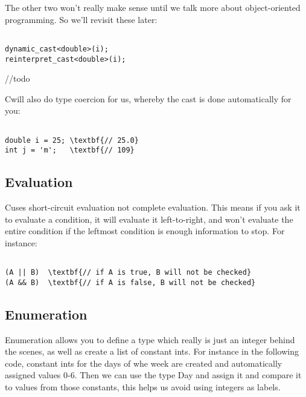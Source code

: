 \documentclass{IEEEtran}
\newcommand{\cpp}{C\nolinebreak\hspace{-.05em}\raisebox{.15ex}{\small\bf +}\nolinebreak\hspace{-.10em}\raisebox{.15ex}{\small\bf+\ }}
\begin{document}
The other two won't really make sense until we talk more about object-oriented programming. So we'll revisit these later:

\begin{Verbatim}[fontsize=\scriptsize, xleftmargin=.3in, commandchars=\\\{\}]
          
dynamic_cast<double>(i);            
reinterpret_cast<double>(i);

\end{Verbatim}

//todo

\cpp will also do type coercion for us, whereby the cast is done automatically for you: 
\begin{Verbatim}[fontsize=\scriptsize, xleftmargin=.3in, commandchars=\\\{\}]
          
double i = 25; \textbf{// 25.0}
int j = 'm';   \textbf{// 109}
\end{Verbatim}


\subsection{Evaluation}

\cpp uses short-circuit evaluation not complete evaluation. This means if you ask it to evaluate a condition, it will evaluate it left-to-right, and won't evaluate the entire condition if the leftmost condition is enough information to stop. For instance:

\begin{Verbatim}[fontsize=\scriptsize, xleftmargin=.3in, commandchars=\\\{\}]
          
(A || B)  \textbf{// if A is true, B will not be checked}
(A && B)  \textbf{// if A is false, B will not be checked}
\end{Verbatim}

\subsection{Enumeration}

Enumeration allows you to define a type which really is just an integer behind the scenes, as well as create a list of constant ints. For instance in the following code, constant ints for the days of whe week are created and automatically assigned values 0-6. Then we can use the type Day and assign it and compare it to values from those constants, this helps us avoid using integers as labels.
\end{document}
